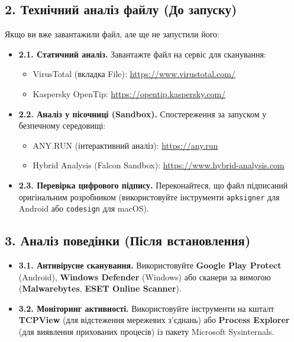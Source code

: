 \subsection*{2. Технічний аналіз файлу (До запуску)}

Якщо ви вже завантажили файл, але ще не запустили його:

\begin{itemize}
    \item \textbf{2.1. Статичний аналіз.} Завантажте файл на сервіс для сканування:
    \begin{itemize}
        \item VirusTotal (вкладка File): \url{https://www.virustotal.com/}
        \item Kaspersky OpenTip: \url{https://opentip.kaspersky.com/}
    \end{itemize}

    \item \textbf{2.2. Аналіз у пісочниці (Sandbox).} Спостереження за запуском у безпечному середовищі:
    \begin{itemize}
        \item ANY.RUN (інтерактивний аналіз): \url{https://any.run}
        \item Hybrid Analysis (Falcon Sandbox): \url{https://www.hybrid-analysis.com}
    \end{itemize}
    
    \item \textbf{2.3. Перевірка цифрового підпису.} Переконайтеся, що файл підписаний оригінальним розробником (використовуйте інструменти \texttt{apksigner} для Android або \texttt{codesign} для macOS).
\end{itemize}

\subsection*{3. Аналіз поведінки (Після встановлення)}

\begin{itemize}
    \item \textbf{3.1. Антивірусне сканування.}
    Використовуйте \textbf{Google Play Protect} (Android), \textbf{Windows Defender} (Windows) або сканери за вимогою (\textbf{Malwarebytes}, \textbf{ESET Online Scanner}).
    
    \item \textbf{3.2. Моніторинг активності.}
    Використовуйте інструменти на кшталт \textbf{TCPView} (для відстеження мережевих з'єднань) або \textbf{Process Explorer} (для виявлення прихованих процесів) із пакету Microsoft Sysinternals.
\end{itemize}

